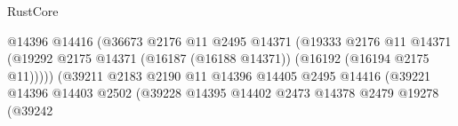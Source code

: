 \begin{lexlean}{RustCore}
\begin{coremodule}
                                                              @14396
                                                              @14416
                                                              (@36673
                                                                @2176
                                                                @11
                                                                @2495
                                                                @14371
                                                                (@19333
                                                                  @2176
                                                                  @11
                                                                  @14371
                                                                  (@19292
                                                                    @2175
                                                                    @14371
                                                                    (@16187 (@16188 @14371))
                                                                    (@16192 (@16194 @2175 @11)))))
                                                              (@39211
                                                                @2183
                                                                @2190
                                                                @11
                                                                @14396
                                                                @14405
                                                                @2495
                                                                @14416
                                                                (@39221
                                                                  @14396
                                                                  @14403
                                                                  @2502
                                                                  (@39228
                                                                    @14395
                                                                    @14402
                                                                    @2473
                                                                    @14378
                                                                    @2479
                                                                    @19278
                                                                    (@39242

\end{coremodule}
\end{lexlean}
